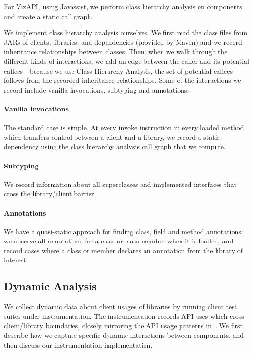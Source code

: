 For VizAPI, using Javassist, we 
perform class hierarchy analysis on components and create a static call
graph. 

We implement class hierarchy analysis ourselves. We first read the class files from JARs of clients, libraries, and dependencies (provided by Maven) and we record
inheritance relationships between classes. Then, when we walk through the different kinds of interactions,
 we add an edge between the caller and its potential callees---because we use Class Hierarchy Analysis, the set of potential callees follows from the recorded inheritance relationships.
Some of the interactions we record include vanilla invocations, subtyping and annotations.

\paragraph{Vanilla invocations}
The standard case is simple. At every invoke instruction in every
loaded method which transfers control between a client and a
library, we record a static dependency using the class hierarchy
analysis call graph that we compute.

\paragraph{Subtyping}
We record information about all superclasses and implemented interfaces that cross the library/client barrier. 

\paragraph{Annotations}
We have a quasi-static approach for finding class, field and method annotations:
we observe all annotations for a class or class member when it is loaded, and
record cases where a class or member declares an annotation from the library of interest.

\subsection{Dynamic Analysis}
\label{subsec:dynamic}
We collect dynamic data about client usages of libraries by running client
test suites under instrumentation. The instrumentation records API
uses which cross client/library boundaries, closely mirroring the API
usage patterns
in~\cite{venkatanarayanan22:_study_lever_api_usage_patter}. We first
describe how we capture specific dynamic interactions between components, and
then discuss our instrumentation implementation.

